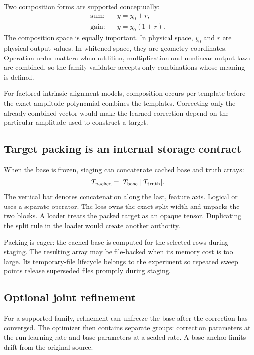 \documentclass[10pt,aps,prd,twocolumn,nofootinbib]{revtex4-2}
\begin{document}
Two composition forms are supported conceptually:
\begin{align*}
 \text{sum:}\quad & y=y_0+r,\\
 \text{gain:}\quad & y=y_0(1+r).
\end{align*}
The composition space is equally important.  In physical space, \(y_0\) and
\(r\) are physical output values.  In whitened space, they are geometry
coordinates.  Operation order matters when addition, multiplication and
nonlinear output laws are combined, so the family validator accepts only
combinations whose meaning is defined.

For factored intrinsic-alignment models, composition occurs per template
before the exact amplitude polynomial combines the templates.  Correcting
only the already-combined vector would make the learned correction depend on
the particular amplitude used to construct a target.

\subsection{Target packing is an internal storage contract}

When the base is frozen, staging can concatenate cached base and truth arrays:
\begin{equation*}
 T_{\rm packed}=[T_{\rm base}\mid T_{\rm truth}].
\end{equation*}
The vertical bar denotes concatenation along the last, feature axis.  Logical
or uses a separate operator.  The loss owns the exact split width and unpacks the two
blocks.  A loader treats the packed target as an opaque tensor.  Duplicating
the split rule in the loader would create another authority.

Packing is eager: the cached base is computed for the selected rows during
staging.  The resulting array may be file-backed when its memory cost is too
large.  Its temporary-file lifecycle belongs to the experiment so repeated
sweep points release superseded files promptly during staging.

\subsection{Optional joint refinement}

For a supported family, refinement can unfreeze the base after the correction
has converged.  The optimizer then contains separate groups: correction
parameters at the run learning rate and base parameters at a scaled rate.  A
base anchor limits drift from the original source.
\end{document}
